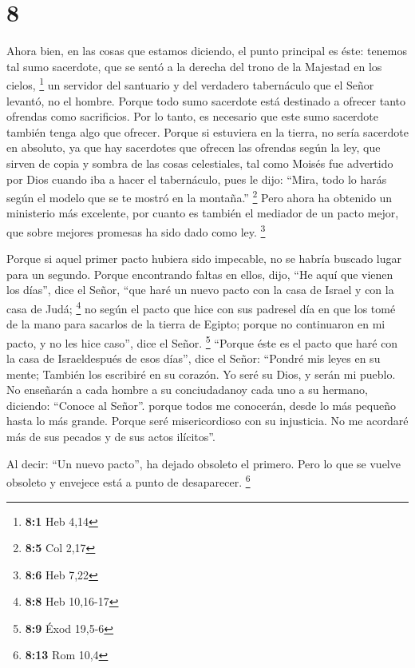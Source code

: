\hypertarget{section-7}{%
\section{8}\label{section-7}}

 Ahora bien, en las cosas que estamos diciendo, el punto
principal es éste: tenemos tal sumo sacerdote, que se sentó a la derecha
del trono de la Majestad en los cielos, \footnote{\textbf{8:1} Heb 4,14}
 un servidor del santuario y del verdadero tabernáculo que
el Señor levantó, no el hombre.  Porque todo sumo
sacerdote está destinado a ofrecer tanto ofrendas como sacrificios. Por
lo tanto, es necesario que este sumo sacerdote también tenga algo que
ofrecer.  Porque si estuviera en la tierra, no sería
sacerdote en absoluto, ya que hay sacerdotes que ofrecen las ofrendas
según la ley,  que sirven de copia y sombra de las cosas
celestiales, tal como Moisés fue advertido por Dios cuando iba a hacer
el tabernáculo, pues le dijo: ``Mira, todo lo harás según el modelo que
se te mostró en la montaña.'' \footnote{\textbf{8:5} Col 2,17}
 Pero ahora ha obtenido un ministerio más excelente, por
cuanto es también el mediador de un pacto mejor, que sobre mejores
promesas ha sido dado como ley. \footnote{\textbf{8:6} Heb 7,22}

 Porque si aquel primer pacto hubiera sido impecable, no
se habría buscado lugar para un segundo.  Porque
encontrando faltas en ellos, dijo, ``He aquí que vienen los días'', dice
el Señor, ``que haré un nuevo pacto con la casa de Israel y con la casa
de Judá; \footnote{\textbf{8:8} Heb 10,16-17}  no según el
pacto que hice con sus padresel día en que los tomé de la mano para
sacarlos de la tierra de Egipto; porque no continuaron en mi pacto, y no
les hice caso'', dice el Señor. \footnote{\textbf{8:9} Éxod 19,5-6}
 ``Porque éste es el pacto que haré con la casa de
Israeldespués de esos días'', dice el Señor: ``Pondré mis leyes en su
mente; También los escribiré en su corazón. Yo seré su Dios, y serán mi
pueblo.  No enseñarán a cada hombre a su conciudadanoy
cada uno a su hermano, diciendo: ``Conoce al Señor''. porque todos me
conocerán, desde lo más pequeño hasta lo más grande. 
Porque seré misericordioso con su injusticia. No me acordaré más de sus
pecados y de sus actos ilícitos''.

 Al decir: ``Un nuevo pacto'', ha dejado obsoleto el
primero. Pero lo que se vuelve obsoleto y envejece está a punto de
desaparecer. \footnote{\textbf{8:13} Rom 10,4}

